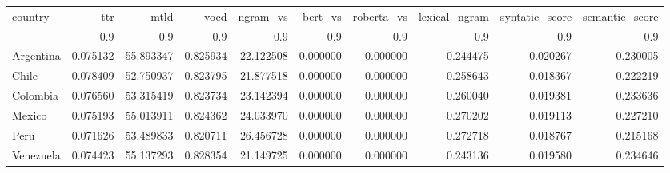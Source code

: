 \begin{tabular}{lrrrrrrrrr}
\toprule
country & ttr & mtld & vocd & ngram_vs & bert_vs & roberta_vs & lexical_ngram & syntatic_score & semantic_score \\
 & 0.9 & 0.9 & 0.9 & 0.9 & 0.9 & 0.9 & 0.9 & 0.9 & 0.9 \\
\midrule
Argentina & 0.075132 & 55.893347 & 0.825934 & 22.122508 & 0.000000 & 0.000000 & 0.244475 & 0.020267 & 0.230005 \\
Chile & 0.078409 & 52.750937 & 0.823795 & 21.877518 & 0.000000 & 0.000000 & 0.258643 & 0.018367 & 0.222219 \\
Colombia & 0.076560 & 53.315419 & 0.823734 & 23.142394 & 0.000000 & 0.000000 & 0.260040 & 0.019381 & 0.233636 \\
Mexico & 0.075193 & 55.013911 & 0.824362 & 24.033970 & 0.000000 & 0.000000 & 0.270202 & 0.019113 & 0.227210 \\
Peru & 0.071626 & 53.489833 & 0.820711 & 26.456728 & 0.000000 & 0.000000 & 0.272718 & 0.018767 & 0.215168 \\
Venezuela & 0.074423 & 55.137293 & 0.828354 & 21.149725 & 0.000000 & 0.000000 & 0.243136 & 0.019580 & 0.234646 \\
\bottomrule
\end{tabular}
